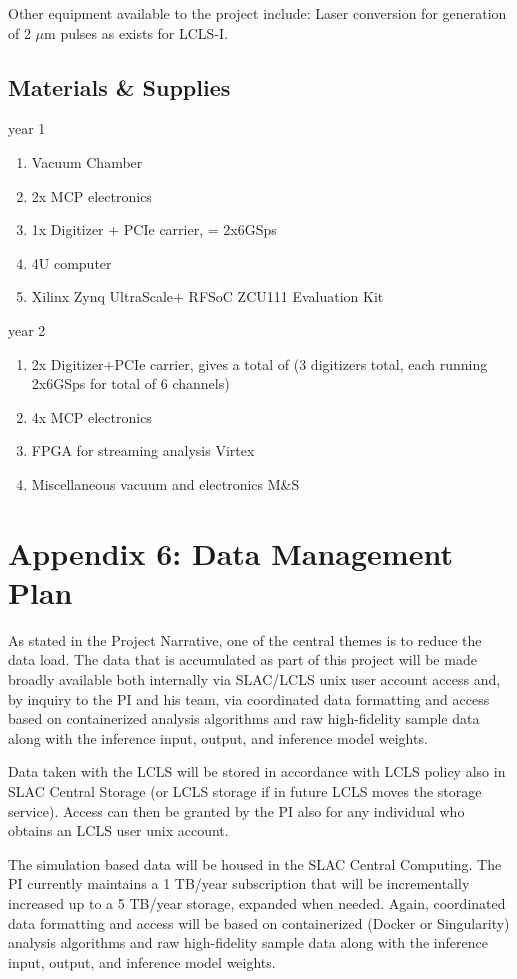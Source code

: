 \noindent Other equipment available to the project include:
Laser conversion for generation of 2 $\mu$m pulses as exists for LCLS-I.

\subsection*{Materials \& Supplies}
year 1
\begin{enumerate}
\item Vacuum Chamber 
\item 2x MCP electronics 
\item 1x Digitizer + PCIe carrier, = 2x6GSps 
\item 4U computer 
\item Xilinx Zynq UltraScale+ RFSoC ZCU111 Evaluation Kit 
\end{enumerate}

year 2
\begin{enumerate}
\item 2x Digitizer+PCIe carrier, gives a total of (3 digitizers total, each running 2x6GSps for total of 6 channels)
\item 4x MCP electronics 
\item FPGA for streaming analysis Virtex   
\item Miscellaneous vacuum and electronics M\&S 
\end{enumerate}

\clearpage
\appendix
\section*{Appendix 6: Data Management Plan}

As stated in the Project Narrative, one of the central themes is to reduce the data load.
The data that is accumulated as part of this project will be made broadly available both internally via SLAC/LCLS unix user account access and, by inquiry to the PI and his team, via coordinated data formatting and access based on containerized analysis algorithms and raw high-fidelity sample data along with the inference input, output, and inference model weights.

Data taken with the LCLS will be stored in accordance with LCLS policy also in SLAC Central Storage (or LCLS storage if in future LCLS moves the storage service).
Access can then be granted by the PI also for any individual who obtains an LCLS user unix account. 

The simulation based data will be housed in the SLAC Central Computing.  
The PI currently maintains a 1 TB/year subscription that will be incrementally increased up to a 5 TB/year storage, expanded when needed.
Again, coordinated data formatting and access will be based on containerized (Docker or Singularity) analysis algorithms and raw high-fidelity sample data along with the inference input, output, and inference model weights.
